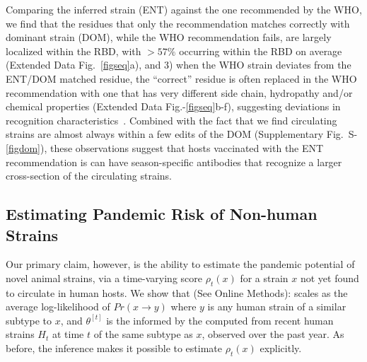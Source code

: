 \documentclass[onecolumn, compsoc,10pt]{IEEEtran}
\def\EXTENDED{Extended Data\xspace}
\def\SUPPLEMENTARY{Supplementary\xspace}
\def\METHODS{Online Methods\xspace}
\begin{document}
Comparing the \enet inferred strain (ENT) against the one recommended by the WHO, we find that the residues that only the  \enet recommendation matches correctly with dominant strain (DOM), while the WHO recommendation fails,  are largely localized within the RBD, with $>57\%$ occurring within  the RBD on average (\EXTENDED Fig.~\ref{figseq}a), and 3) when the WHO strain deviates from  the ENT/DOM   matched residue, the ``correct'' residue is often replaced  in the WHO recommendation with one that has very different side chain, hydropathy  and/or chemical properties (\EXTENDED Fig.-\ref{figseq}b-f), suggesting deviations in recognition characteristics~\cite{carugo2001normalized,righetto2014comparative}. Combined with the fact that we find circulating strains are almost always within a few edits of the DOM (\SUPPLEMENTARY Fig.~S-\ref{figdom}), these observations suggest that  hosts vaccinated with the ENT recommendation is can have season-specific antibodies that recognize a larger cross-section of the circulating strains.

\subsection*{Estimating Pandemic Risk of Non-human Strains}
Our primary claim, however,  is the ability to estimate the pandemic potential of novel animal strains, via a  time-varying \erisk score $\rho_t(x)$ for a strain $x$ not yet found to circulate in human hosts. We show that (See \METHODS):%
%
scales as the average log-likelihood of $Pr(x \rightarrow y)$ where $y$ is any human strain of a similar subtype to $x$, and  $\theta^{[t]}$ is the \qdist informed by the \enet computed from recent human strains $H_t$ at time $t$ of the same subtype as $x$, observed over the past year. As before, the \enet inference makes it possible to estimate $\rho_t(x)$ explicitly. 
\end{document}
